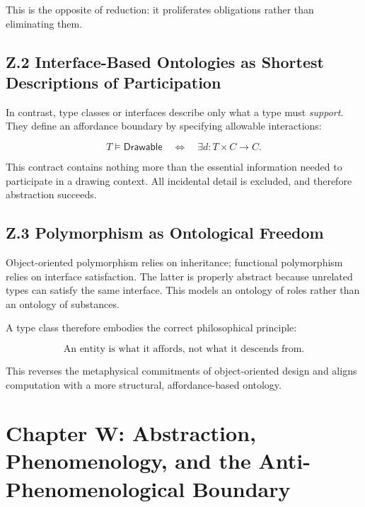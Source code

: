 \documentclass[11pt,letterpaper]{article}
\begin{document}
This is the opposite of reduction: it proliferates obligations rather than eliminating them.

\subsection{Z.2 Interface-Based Ontologies as Shortest Descriptions of Participation}

In contrast, type classes or interfaces describe only what a type must \emph{support}. They define an affordance boundary by specifying allowable interactions:

\[
T \vDash \mathsf{Drawable} \quad \iff \quad \exists d : T \times C \to C.
\]

This contract contains nothing more than the essential information needed to participate in a drawing context. All incidental detail is excluded, and therefore abstraction succeeds.

\subsection{Z.3 Polymorphism as Ontological Freedom}

Object-oriented polymorphism relies on inheritance; functional polymorphism relies on interface satisfaction. The latter is properly abstract because unrelated types can satisfy the same interface. This models an ontology of roles rather than an ontology of substances.

A type class therefore embodies the correct philosophical principle:

\[
\text{An entity is what it affords, not what it descends from.}
\]

This reverses the metaphysical commitments of object-oriented design and aligns computation with a more structural, affordance-based ontology.

\newpage

\section{Chapter W: Abstraction, Phenomenology, and the Anti-Phenomenological Boundary}
\end{document}
